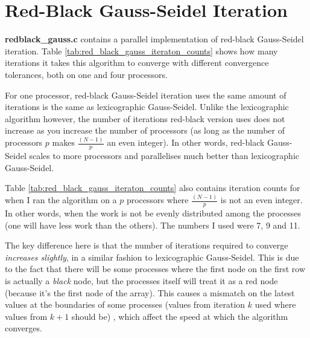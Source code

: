 \documentclass{article}
\begin{document}
\section{Red-Black Gauss-Seidel Iteration}

\textbf{redblack\_gauss.c} contains a parallel implementation of red-black Gauss-Seidel iteration. Table \ref{tab:red_black_gauss_iteraton_counts} shows how many iterations it takes this algorithm to converge with different convergence tolerances, both on one and four processors. 

For one processor, red-black Gauss-Seidel iteration uses the same amount of iterations is the same as lexicographic Gauss-Seidel. Unlike the lexicographic algorithm however, the number of iterations red-black version uses does not increase as you increase the number of processors (as long as the number of processors $p$ makes $\frac{(N - 1)}{p}$ an even integer). In other words, red-black Gauss-Seidel scales to more processors and parallelises much better than lexicographic Gauss-Seidel.

Table \ref{tab:red_black_gauss_iteraton_counts} also contains iteration counts for when I ran the algorithm on a $p$ processors where $\frac{(N - 1)}{p}$ is not an even integer. In other words, when the work is not be evenly distributed among the processes (one will have less work than the others). The numbers I used were 7, 9 and 11. 

The key difference here is that the number of iterations required to converge \textit{increases slightly}, in a similar fashion to lexicographic Gauss-Seidel. This is due to the fact that there will be some processes where the first node on the first row is actually a \textit{black} node, but the processes itself will treat it as a red  node (because it's the first node of the array). This causes a mismatch on the latest values at the boundaries of some processes  (values from iteration $k$ used where values from $k + 1$ should be) , which affect the speed at which the algorithm converges.
\end{document}
